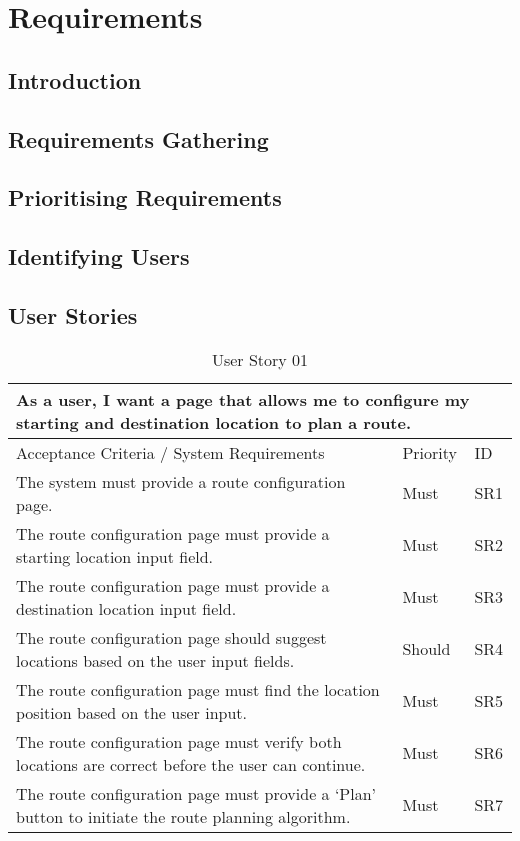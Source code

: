 \setlength{\tabcolsep}{20pt}
\renewcommand{\arraystretch}{1.5}

\chapter{Requirements}
\label{chap:requirements}

\section{Introduction}
\label{requirements:intro}

\section{Requirements Gathering}
\label{requirements:gathering}

\section{Prioritising Requirements}
\label{requirements:prioritising}

\section{Identifying Users}
\label{requirements:identifyingusers}

\clearpage
\section{User Stories}
\label{requirements:user-stories}

\begin{table}[!htb]

\caption{User Story 01}
\label{tab:user-story-01}
\begin{tabular}{ p{8cm} p{1cm}  p{1cm} }
\hline
\multicolumn{3}{p{13cm}}{As a user, I want a page that allows me to configure my starting and destination location to plan a route.}\\ 
\hline
Acceptance Criteria / System Requirements & Priority & ID\\
\hline
The system must provide a route configuration page. & Must & SR1\\
The route configuration page must provide a starting location input field. & Must & SR2\\
The route configuration page must provide a destination location input field. & Must & SR3\\ 
The route configuration page should suggest locations based on the user input fields. & Should & SR4\\ 
The route configuration page must find the location position based on the user input. & Must & SR5\\ 
The route configuration page must verify both locations are correct before the user can continue. & Must & SR6\\ 
The route configuration page must provide a ‘Plan’ button to initiate the route planning algorithm. & Must & SR7\\ 
\hline
\end{tabular}
\end{table}

